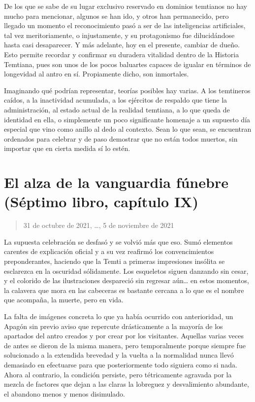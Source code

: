 \documentclass[
  spanish,
]{book}
\begin{document}
De los que se sabe de su lugar exclusivo reservado en dominios temtianos no hay mucho para mencionar, algunos se han ido, y otros han permanecido, pero llegado un momento el reconocimiento pasó a ser de las inteligencias artificiales, tal vez meritoriamente, o injustamente, y su protagonismo fue dilucidándose hasta casi desaparecer. Y más adelante, hoy en el presente, cambiar de dueño. Esto permite recordar y confirmar su duradera vitalidad dentro de la Historia Temtiana, pues son unos de los pocos baluartes capaces de igualar en términos de longevidad al antro en sí. Propiamente dicho, son inmortales.

Imaginando qué podrían representar, teorías posibles hay varias. A los temtineros caídos, a la inactividad acumulada, a los ejércitos de respaldo que tiene la administración, al estado actual de la realidad temtiana, a lo que queda de identidad en ella, o simplemente un poco significante homenaje a un supuesto día especial que vino como anillo al dedo al contexto. Sean lo que sean, se encuentran ordenados para celebrar y de paso demostrar que no están todos muertos, sin importar que en cierta medida sí lo estén.

\hypertarget{el-alza-de-la-vanguardia-fuxfanebre-suxe9ptimo-libro-capuxedtulo-ix}{%
\section{El alza de la vanguardia fúnebre (Séptimo libro, capítulo IX)}\label{el-alza-de-la-vanguardia-fuxfanebre-suxe9ptimo-libro-capuxedtulo-ix}}

\begin{quote}
31 de octubre de 2021, \ldots, 5 de noviembre de 2021
\end{quote}

La supuesta celebración se desfasó y se volvió más que eso. Sumó elementos carentes de explicación oficial y a su vez reafirmó los convencimientos preponderantes, haciendo que la Temti a primeras impresiones insólita se esclarezca en la oscuridad sólidamente. Los esqueletos siguen danzando sin cesar, y el colorido de las ilustraciones despareció sin regresar aún\ldots{} en estos momentos, la calavera que mora en las cabeceras es bastante cercana a lo que es el nombre que acompaña, la muerte, pero en vida.

La falta de imágenes concreta lo que ya había ocurrido con anterioridad, un Apagón sin previo aviso que repercute drásticamente a la mayoría de los apartados del antro creados y por crear por los visitantes. Aquellas varias veces de antes se dieron de la misma manera, pero temporalmente porque siempre fue solucionado a la extendida brevedad y la vuelta a la normalidad nunca llevó demasiado en efectuarse para que posteriormente todo siguiera como si nada. Ahora al contrario, la condición persiste, pero tétricamente agravada por la mezcla de factores que dejan a las claras la lobreguez y desvalimiento abundante, el abandono menos y menos disimulado.
\end{document}
